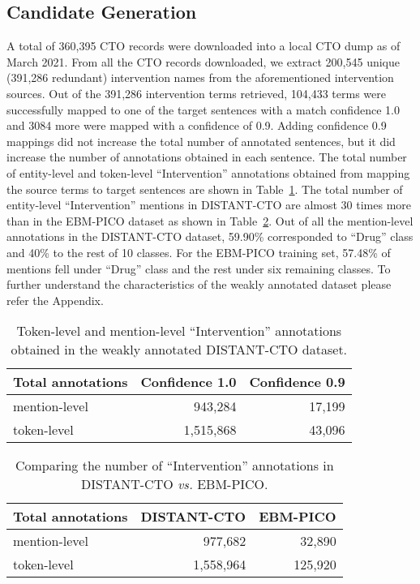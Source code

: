 \documentclass[letterpaper]{article} %
\begin{document}
\subsection{Candidate Generation}
\label{subsec:res_cand}
%
A total of 360,395 CTO records were downloaded into a local CTO dump as of March 2021.
From all the CTO records downloaded, we extract 200,545 unique (391,286 redundant) intervention names from the aforementioned intervention sources.
Out of the 391,286 intervention terms retrieved, 104,433 terms were successfully mapped to one of the target sentences with a match confidence 1.0 and 3084 more were mapped with a confidence of 0.9.
Adding confidence 0.9 mappings did not increase the total number of annotated sentences, but it did increase the number of annotations obtained in each sentence.
The total number of entity-level and token-level ``Intervention'' annotations obtained from mapping the source terms to target sentences are shown in Table~\ref{table:res_candgen}.
The total number of entity-level ``Intervention'' mentions in DISTANT-CTO are almost 30 times more than in the EBM-PICO dataset as shown in Table~\ref{table:candcomp}.
Out of all the mention-level annotations in the DISTANT-CTO dataset, 59.90\% corresponded to ``Drug'' class and 40\% to the rest of 10 classes.
For the EBM-PICO training set, 57.48\% of mentions fell under ``Drug'' class and the rest under six remaining classes.
To further understand the characteristics of the weakly annotated dataset please refer the Appendix.
%
\begin{table}[!htbp]
\centering
\begin{tabular}{lrr}
\hline \textbf{Total annotations} & \textbf{Confidence 1.0} & \textbf{Confidence 0.9} \\ \hline
mention-level & 943,284 & 17,199 \\
token-level & 1,515,868 & 43,096 \\
\hline
\end{tabular}
\caption{Token-level and mention-level ``Intervention'' annotations obtained in the weakly annotated DISTANT-CTO dataset.}
\label{table:res_candgen} 
\end{table}
%
\begin{table}[!htbp]
\centering
\begin{tabular}{lrr}
\hline \textbf{Total annotations} & \textbf{DISTANT-CTO} & \textbf{EBM-PICO} \\ \hline
mention-level & 977,682 & 32,890\\
token-level & 1,558,964 & 125,920 \\
\hline
\end{tabular}
\caption{Comparing the number of ``Intervention'' annotations in DISTANT-CTO \textit{vs.} EBM-PICO.}
\label{table:candcomp} 
\end{table}
\end{document}
